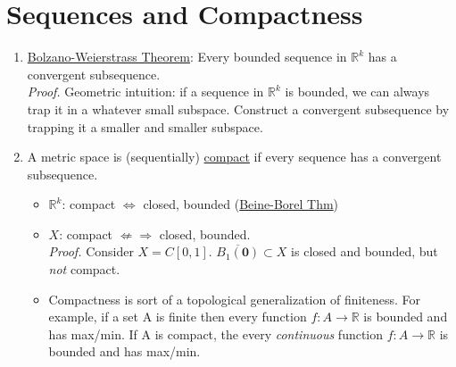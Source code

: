 \documentclass[%
 aip,
 jmp,%
 amsmath,amssymb,
 reprint,%
]{revtex4-1}
\def\R{{\mathbb R}}
\renewenvironment{proof}{\color{gray}\footnotesize\emph{Proof.}}{}
\renewcommand{\iff}{\Leftrightarrow}
\newcommand{\defn}[1]{\underline{#1}}
\newcommand{\closure}[1]{\overline{#1}}
\begin{document}
\section{Sequences and Compactness}
\begin{enumerate}
  \item \defn{Bolzano-Weierstrass Theorem}: Every bounded sequence in $\R^k$
  has a convergent subsequence. \\
      \begin{proof}
        Geometric intuition: if a sequence in $\R^k$ is bounded, we can always
        trap it in a whatever small subspace. Construct a convergent subsequence
        by trapping it a smaller and smaller subspace.
      \end{proof}

    \item A metric space is (sequentially) \defn{compact} if every sequence
    has a convergent subsequence.
        \begin{itemize}
          \item $\R^k$: compact $\iff$ closed, bounded (\defn{Beine-Borel Thm})
          \item $X$: compact $\not\Leftarrow\Rightarrow$ closed, bounded. \\
              \begin{proof}
                Consider $X=C[0,1]$. $\closure{B_1(\bm{0})} \subset X$ is
                closed and bounded, but \emph{not} compact.
              \end{proof}
          \footnotesize
          \item Compactness is sort of a topological generalization of finiteness.
          \color{gray} For example, if a set A is finite then every function
          $f:A \to \R$ is bounded and has max/min. If A is compact, the every
          \emph{continuous} function $f:A \to \R$ is bounded and has max/min.

        \end{itemize}
\end{enumerate}
\end{document}
